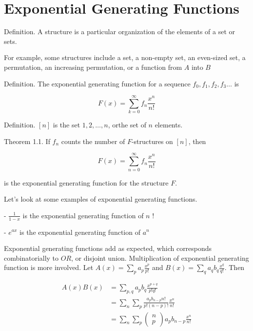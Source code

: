 


\section{Exponential Generating Functions}

Definition. A structure is a particular organization of the elements of a set or sets.

For example, some structures include a set, a non-empty set, an even-sized set, a permutation, an increasing permutation, or a function from $A$ into $B$

Definition. The exponential generating function for a sequence $f_{0}, f_{1}, f_{2}, f_{3} \ldots$ is

$$
F(x)=\sum_{k=0}^{\infty} f_{n} \frac{x^{n}}{n !}
$$

Definition. $[n]$ is the set $1,2, \ldots, n$, orthe set of $n$ elements.

Theorem 1.1. If $f_{n}$ counts the number of $F$-structures on $[n]$, then

$$
F(x)=\sum_{n=0}^{\infty} f_{n} \frac{x^{n}}{n !}
$$

is the exponential generating function for the structure $F$.

Let's look at some examples of exponential generating functions.

- $\frac{1}{1-x}$ is the exponential generating function of $n$ !

- $e^{a x}$ is the exponential generating function of $a^{n}$

Exponential generating functions add as expected, which corresponds combinatorially to $O R$, or disjoint union. Multiplication of exponential generating function is more involved. Let $A(x)=\sum_{p} a_{p} \frac{x^{p}}{p !}$ and $B(x)=\sum_{q} a_{q} b_{q} \frac{x^{q}}{q !}$. Then

$$
\begin{aligned}
A(x) B(x) & =\sum_{p, q} a_{p} b_{q} \frac{x^{p+q}}{p ! q !} \\
& =\sum_{n} \sum_{p} \frac{a_{p} b_{n-p} n !}{p !(n-p) !} \frac{x^{n}}{n !} \\
& =\sum_{n} \sum_{p}\left(\begin{array}{l}
n \\
p
\end{array}\right) a_{p} b_{n-p} \frac{x^{n}}{n !}
\end{aligned}
$$

